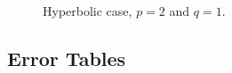 \newpage

\vspace*{\fill}
\begin{figure}[!ht]
    \centering
    \begin{subfigure}[t]{0.49\textwidth}
        \centering
        
    \end{subfigure}
    \par\bigskip
    \begin{subfigure}[t]{0.49\textwidth}
        \centering
        
    \end{subfigure}
    \hfill
    \begin{subfigure}[t]{0.49\textwidth}
        \centering
        
    \end{subfigure}
    \caption{Hyperbolic case, $p = 2$ and $q = 1$.}
\end{figure}
\vspace*{\fill}

\newpage
\subsection{Error Tables} \label{sec:tables}


